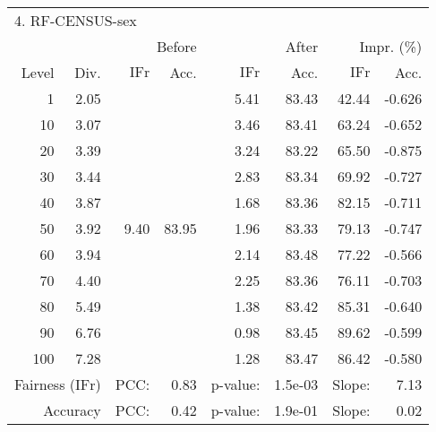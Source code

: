 \begin{tabular}{rr||rr|rr|rr}
\multicolumn{4}{l}{4. RF-CENSUS-sex} & \multicolumn{2}{c}{} & \multicolumn{2}{c}{}\\
 &  & \multicolumn{2}{r|}{Before} & \multicolumn{2}{r|}{After} & \multicolumn{2}{r}{Impr. (\%)}\\
Level & Div. & $\mathrm{IFr}$ & Acc. & $\mathrm{IFr}$ & Acc. & $\mathrm{IFr}$ & Acc.\\
\hline
1 & 2.05 & \multirow{11}{*}{9.40} & \multirow{11}{*}{83.95} & 5.41 & 83.43 & 42.44 & -0.626\\
10 & 3.07 &  &  & 3.46 & 83.41 & 63.24 & -0.652\\
20 & 3.39 &  &  & 3.24 & 83.22 & 65.50 & -0.875\\
30 & 3.44 &  &  & 2.83 & 83.34 & 69.92 & -0.727\\
40 & 3.87 &  &  & 1.68 & 83.36 & 82.15 & -0.711\\
50 & 3.92 &  &  & 1.96 & 83.33 & 79.13 & -0.747\\
60 & 3.94 &  &  & 2.14 & 83.48 & 77.22 & -0.566\\
70 & 4.40 &  &  & 2.25 & 83.36 & 76.11 & -0.703\\
80 & 5.49 &  &  & 1.38 & 83.42 & 85.31 & -0.640\\
90 & 6.76 &  &  & 0.98 & 83.45 & 89.62 & -0.599\\
100 & 7.28 &  &  & 1.28 & 83.47 & 86.42 & -0.580\\
\hline
\multicolumn{2}{r}{Fairness ($\mathrm{IFr}$)} & PCC: & \multicolumn{1}{r}{0.83} & p-value:  & \multicolumn{1}{r}{1.5e-03} & Slope:  & 7.13\\
\multicolumn{2}{r}{Accuracy} & PCC: & \multicolumn{1}{r}{0.42} & p-value:  & \multicolumn{1}{r}{1.9e-01} & Slope:  & 0.02\\
\end{tabular}